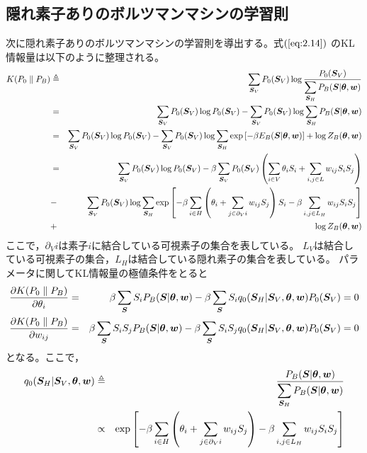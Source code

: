 \subsection{隠れ素子ありのボルツマンマシンの学習則}
次に隠れ素子ありのボルツマンマシンの学習則を導出する。式$(\ref{eq:2.14})$
のKL情報量は以下のように整理される。
\begin{eqnarray}
K(P_{0}\parallel P_{B})&\triangleq&\sum_{\bm{S}_{V}}P_{0}(\bm{S}_{V})
\log\frac{P_{0}(\bm{S}_{V})}{\displaystyle\sum_{\bm{S}_{H}}P_{B}(\bm{S}|\boldsymbol{\theta},\bm{w})}\nonumber\\
&=&\sum_{\bm{S}_{V}}P_{0}(\bm{S}_{V})\log P_{0}(\bm{S}_{V})
-\sum_{\bm{S}_{V}}P_{0}(\bm{S}_{V})\log\sum_{\bm{S}_{H}}P_{B}(\bm{S}|\boldsymbol{\theta},\bm{w})\nonumber\\
&=&\sum_{\bm{S}_{V}}P_{0}(\bm{S}_{V})\log P_{0}(\bm{S}_{V})
-\sum_{\bm{S}_{V}}P_{0}(\bm{S}_{V})\log\sum_{\bm{S}_{H}}\exp
\left[-\beta E_{B}(\bm{S}|\boldsymbol{\theta},\bm{w})\right]
+\log Z_{B}(\boldsymbol{\theta},\bm{w})\nonumber\\
&=&\sum_{\bm{S}_{V}}P_{0}(\bm{S}_{V})\log P_{0}(\bm{S}_{V})
-\beta\sum_{\bm{S}_{V}}P_{0}(\bm{S}_{V})\left(\sum_{i\in
V}\theta_{i}S_{i}+\sum_{i,j\in L}w_{ij}S_{i}S_{j}\right)\nonumber\\
&-&\sum_{\bm{S}_{V}}P_{0}(\bm{S}_{V})\log\sum_{\bm{S}_{H}}
\exp\left[-\beta\sum_{i\in H}\left(\theta_{i}+\sum_{j\in\partial_{V}i}
w_{ij}S_{j}\right)S_{i}-\beta\sum_{i,j\in
L_{H}}w_{ij}S_{i}S_{j}\right]\nonumber\\
&+&\log Z_{B}(\boldsymbol{\theta},\bm{w})\label{eq:2.20}
\end{eqnarray}
ここで，$\partial_{V}i$は素子$i$に結合している可視素子の集合を表している。
$L_{V}$は結合している可視素子の集合，$L_{H}$は結合している隠れ素子の集合を表している。
パラメータに関してKL情報量の極値条件をとると
\begin{eqnarray}
\frac{\partial K(P_{0}\parallel P_{B})}{\partial\theta_{i}}
&=&\beta\sum_{\bm{S}}S_{i}P_{B}(\bm{S}|\boldsymbol{\theta},\bm{w})
-\beta\sum_{\bm{S}}S_{i}q_{0}(\bm{S}_{H}|\bm{S}_{V},\boldsymbol{\theta},\bm{w})P_{0}(\bm{S}_{V})=0
\label{eq:2.21}\nonumber\\
\frac{\partial K(P_{0}\parallel P_{B})}{\partial w_{ij}}
&=&\beta\sum_{\bm{S}}S_{i}S_{j}P_{B}(\bm{S}|\boldsymbol{\theta},\bm{w})
-\beta\sum_{\bm{S}}S_{i}S_{j}q_{0}(\bm{S}_{H}|\bm{S}_{V},\boldsymbol{\theta},\bm{w})P_{0}(\bm{S}_{V})=0
\label{eq:2.22}
\end{eqnarray}
となる。ここで，
\begin{eqnarray}
q_{0}(\bm{S}_{H}|\bm{S}_{V},\boldsymbol{\theta},\bm{w})&\triangleq&
\frac{P_{B}(\bm{S}|\boldsymbol{\theta},\bm{w})}{\displaystyle\sum_{\bm{S}_{H}}P_{B}(\bm{S}|\boldsymbol{\theta},\bm{w})}\label{eq:2.23}\\
&\propto&\exp\left[-\beta\sum_{i\in H}\left(\theta_{i}
+\sum_{j\in\partial_{V}i}w_{ij}S_{j}\right)-\beta\sum_{i,j\in
L_{H}}w_{ij}S_{i}S_{j}\right]\label{eq:2.24}
\end{eqnarray}
